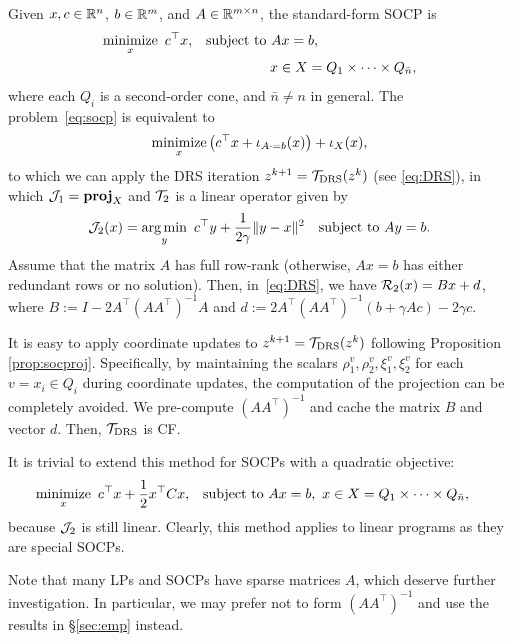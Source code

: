 {{{Given $x,c\in\mathbb{R}^n$, $b\in\mathbb{R}^m$, and $A\in\mathbb{R}^{m\times n}$, the standard-form SOCP is
\begin{subequations}\label{eq:socp}
\begin{align}
\Min_x~c^\top x,&\quad\St~ Ax=b,\\
&\hspace{56pt} x\in X=Q_1\times \cdots\times Q_{\bar{n}},
\end{align}
\end{subequations}
where each $Q_i$ is a second-order cone, and $\bar{n}\not=n$ in general.
The problem~\eqref{eq:socp} is equivalent to 
$$\operatorname*{minimize}_x \big(c^\top  x+\iota_{A\cdot =b}(x)\big)+\iota_X(x),$$
to which we can apply the DRS iteration $z^{k+1} = {{\mathcal{T}}_{\mathrm{DRS}}} (z^k)$ (see \eqref{eq:DRS}), in which ${\mathcal{J}}_1 = {\mathbf{proj}}_X$ and ${\mathcal{T}}_2$ is a linear operator given by 
$${\mathcal{J}}_2(x) = \operatorname*{arg\,min}_y ~ c^\top y+  \frac{1}{2\gamma}\|y-x\|^2\quad {\mathrm{subject~to}}~ Ay=b.$$
Assume that the matrix $A$ has full row-rank (otherwise, $Ax=b$ has either redundant rows or no solution). 
Then, in~\eqref{eq:DRS}, we have ${\mathcal{R}}_{2}(x)= Bx+d$, where $B:=I-2A^\top (AA^\top )^{-1}A$ and $d:=2A^\top (AA^\top )^{-1}(b+\gamma Ac)-2\gamma c$.

It is easy to apply coordinate updates to $z^{k+1} = {{\mathcal{T}}_{\mathrm{DRS}}} (z^k)$ following Proposition \ref{prop:socproj}. Specifically, by maintaining the scalars $\rho_1^v,\rho_2^v,\xi_1^v,\xi_2^v$ for each $v=x_i\in Q_i$ during  coordinate updates, the computation of the projection can be completely avoided. We pre-compute $(AA^\top )^{-1}$ and cache the matrix $B$ and vector $d$. Then, ${{\mathcal{T}}_{\mathrm{DRS}}}$ is CF. 

It is trivial to extend this method for  SOCPs with a quadratic objective:
\begin{align*}
\Min_x~c^\top x+\frac{1}{2}x^\top Cx,&\quad\St~ Ax=b,~ x\in X=Q_1\times \cdots\times Q_{\bar{n}},
\end{align*}
because ${\mathcal{J}}_2$ is still linear.  Clearly, this method applies to linear programs as they are special SOCPs.

Note that many LPs and SOCPs have sparse matrices $A$, which deserve further investigation. In particular, we may prefer not to form $(AA^\top )^{-1}$ and use the results in \S\ref{sec:emp} instead.

}}}
